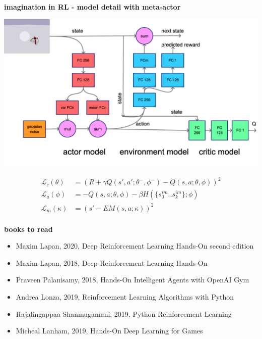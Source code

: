\documentclass[xcolor=dvipsnames]{beamer}
\begin{document}
\begin{frame}{\bf imagination in RL - model detail with meta-actor}

  {\centering \includegraphics[scale=0.1]{../diagrams/imaginationmodeldetail.png}}

  
    \begin{align*}
      \mathcal{L}_c(\theta) &= \left( R + \gamma Q(s', a'; \theta^-, \phi^- ) - Q(s, a; \theta, \phi )  \right)^2 \\
      \mathcal{L}_a(\phi) &= -Q(s, a; \theta, \phi) - \beta H(\{s^{im}_0 .. s^{im}_k\}; \phi) \\
      \mathcal{L}_m(\kappa) &= \left( s' - EM(s, a; \kappa)  \right)^2 \\    
    \end{align*}
\end{frame}



\begin{frame}{\bf books to read}

\begin{itemize}
  \item Maxim Lapan, 2020, Deep Reinforcement Learning Hands-On second edition
  \item Maxim Lapan, 2018, Deep Reinforcement Learning Hands-On
  \item Praveen Palanisamy, 2018, Hands-On Intelligent Agents with OpenAI Gym
  \item Andrea Lonza, 2019, Reinforcement Learning Algorithms with Python
  \item Rajalingappaa Shanmugamani, 2019, Python Reinforcement Learning
  \item Micheal Lanham, 2019, Hands-On Deep Learning for Games
\end{itemize}


\end{frame}
\end{document}
